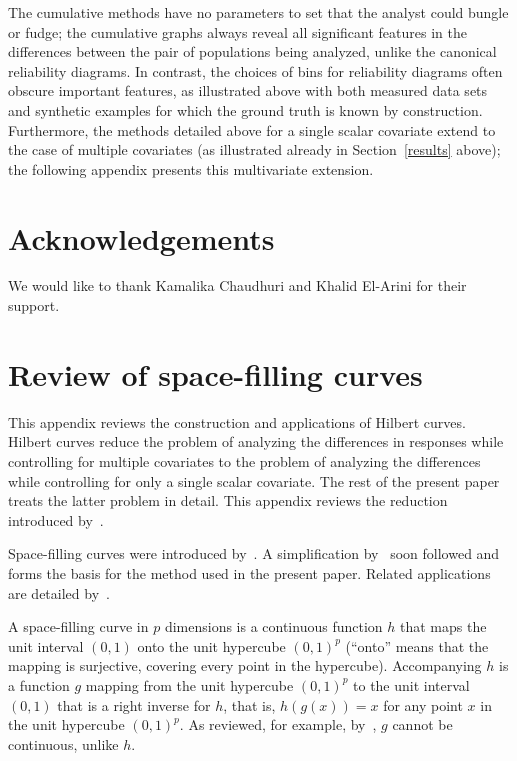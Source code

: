 \documentclass{article}
\begin{document}
The cumulative methods have no parameters to set that the analyst could bungle
or fudge; the cumulative graphs always reveal all significant features
in the differences between the pair of populations being analyzed,
unlike the canonical reliability diagrams. In contrast, the choices of bins
for reliability diagrams often obscure important features,
as illustrated above with both measured data sets and synthetic examples
for which the ground truth is known by construction.
Furthermore, the methods detailed above for a single scalar covariate extend
to the case of multiple covariates (as illustrated already
in Section~\ref{results} above); the following appendix presents
this multivariate extension.



\section*{Acknowledgements}

We would like to thank Kamalika Chaudhuri and Khalid El-Arini
for their support.



\appendix
\section{Review of space-filling curves}
\label{multidim}

This appendix reviews the construction and applications of Hilbert curves.
Hilbert curves reduce the problem of analyzing the differences in responses
while controlling for multiple covariates to the problem of analyzing
the differences while controlling for only a single scalar covariate.
The rest of the present paper treats the latter problem in detail.
This appendix reviews the reduction introduced by~\cite{tygert_multidim}.

Space-filling curves were introduced by~\cite{peano}.
A simplification by~\cite{hilbert} soon followed
and forms the basis for the method used in the present paper.
Related applications are detailed by~\cite{moon-jagadish-faloutsos-saltz}.

A space-filling curve in $p$ dimensions is a continuous function $h$
that maps the unit interval $(0, 1)$ onto the unit hypercube $(0, 1)^p$
(``onto'' means that the mapping is surjective, covering every point
in the hypercube).
Accompanying $h$ is a function $g$ mapping from the unit hypercube $(0, 1)^p$
to the unit interval $(0, 1)$ that is a right inverse for $h$, that is,
$h(g(x)) = x$ for any point $x$ in the unit hypercube $(0, 1)^p$.
As reviewed, for example, by~\cite{tygert_multidim},
$g$ cannot be continuous, unlike $h$.
\end{document}

